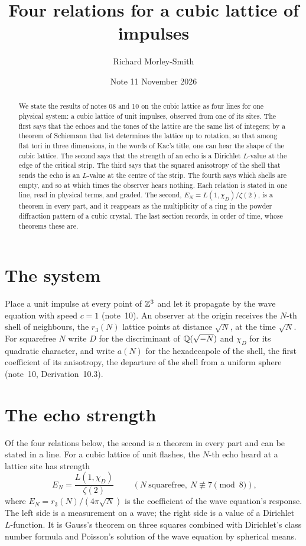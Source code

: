 \documentclass[11pt]{article}
\title{Four relations for a cubic lattice of impulses}
\author{Richard Morley-Smith}
\date{Note 11 \quad November 2026}
\begin{document}
\maketitle

\begin{abstract}
\noindent
We state the results of notes 08 and 10 on the cubic lattice as four lines for one physical system: a cubic lattice of unit impulses, observed from one of its sites.
The first says that the echoes and the tones of the lattice are the same list of integers; by a theorem of Schiemann that list determines the lattice up to rotation, so that among flat tori in three dimensions, in the words of Kac's title, one can hear the shape of the cubic lattice.
The second says that the strength of an echo is a Dirichlet $L$-value at the edge of the critical strip.
The third says that the squared anisotropy of the shell that sends the echo is an $L$-value at the centre of the strip.
The fourth says which shells are empty, and so at which times the observer hears nothing.
Each relation is stated in one line, read in physical terms, and graded.
The second, $E_N = L(1,\chi_D)/\zeta(2)$, is a theorem in every part, and it reappears as the multiplicity of a ring in the powder diffraction pattern of a cubic crystal.
The last section records, in order of time, whose theorems these are.
\end{abstract}

\section{The system}

Place a unit impulse at every point of $\mathbb{Z}^3$ and let it propagate by the wave equation with speed $c = 1$ (note~10).
An observer at the origin receives the $N$-th shell of neighbours, the $r_3(N)$ lattice points at distance $\sqrt N$, at the time $\sqrt N$.
For squarefree $N$ write $D$ for the discriminant of $\mathbb{Q}(\sqrt{-N})$ and $\chi_D$ for its quadratic character, and write $a(N)$ for the hexadecapole of the shell, the first coefficient of its anisotropy, the departure of the shell from a uniform sphere (note~10, Derivation~10.3).

\section{The echo strength}

Of the four relations below, the second is a theorem in every part and can be stated in a line.
For a cubic lattice of unit flashes, the $N$-th echo heard at a lattice site has strength
\[
  \boxed{\;E_N = \frac{L(1,\chi_D)}{\zeta(2)}\;}\qquad(N\ \text{squarefree},\ N\not\equiv7\pmod 8),
\]
where $E_N = r_3(N)/(4\pi\sqrt N)$ is the coefficient of the wave equation's response.
The left side is a measurement on a wave; the right side is a value of a Dirichlet $L$-function.
It is Gauss's theorem on three squares combined with Dirichlet's class number formula and Poisson's solution of the wave equation by spherical means.
\end{document}
